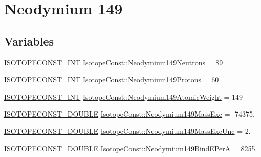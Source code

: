 \hypertarget{group___isotope_const-_neodymium-_nd149}{}\section{Neodymium 149}
\label{group___isotope_const-_neodymium-_nd149}
\subsection*{Variables}
\begin{DoxyCompactItemize}
\item 
\mbox{\hyperlink{group___isotope_const-_macros_ga5f18360b3e99483a35c32d789e62621c}{I\+S\+O\+T\+O\+P\+E\+C\+O\+N\+S\+T\+\_\+\+I\+NT}} \mbox{\hyperlink{group___isotope_const-_neodymium-_nd149_ga91c16a3af0b89b02246fdb759c967365}{Isotope\+Const\+::\+Neodymium149\+Neutrons}} = 89
\item 
\mbox{\hyperlink{group___isotope_const-_macros_ga5f18360b3e99483a35c32d789e62621c}{I\+S\+O\+T\+O\+P\+E\+C\+O\+N\+S\+T\+\_\+\+I\+NT}} \mbox{\hyperlink{group___isotope_const-_neodymium-_nd149_gaab24633ba64d9ac283f7f897c2a4fff1}{Isotope\+Const\+::\+Neodymium149\+Protons}} = 60
\item 
\mbox{\hyperlink{group___isotope_const-_macros_ga5f18360b3e99483a35c32d789e62621c}{I\+S\+O\+T\+O\+P\+E\+C\+O\+N\+S\+T\+\_\+\+I\+NT}} \mbox{\hyperlink{group___isotope_const-_neodymium-_nd149_ga4831a82bcad0592d4f752eb4a90e6da5}{Isotope\+Const\+::\+Neodymium149\+Atomic\+Weight}} = 149
\item 
\mbox{\hyperlink{group___isotope_const-_macros_ga8f45a7272ce02c0b4c65c44636ed719a}{I\+S\+O\+T\+O\+P\+E\+C\+O\+N\+S\+T\+\_\+\+D\+O\+U\+B\+LE}} \mbox{\hyperlink{group___isotope_const-_neodymium-_nd149_ga723d2837d5a39bbaf825508f105f47ae}{Isotope\+Const\+::\+Neodymium149\+Mass\+Exc}} = -\/74375.
\item 
\mbox{\hyperlink{group___isotope_const-_macros_ga8f45a7272ce02c0b4c65c44636ed719a}{I\+S\+O\+T\+O\+P\+E\+C\+O\+N\+S\+T\+\_\+\+D\+O\+U\+B\+LE}} \mbox{\hyperlink{group___isotope_const-_neodymium-_nd149_gae8f868c1cafdf1606cd1c7a3465e4843}{Isotope\+Const\+::\+Neodymium149\+Mass\+Exc\+Unc}} = 2.
\item 
\mbox{\hyperlink{group___isotope_const-_macros_ga8f45a7272ce02c0b4c65c44636ed719a}{I\+S\+O\+T\+O\+P\+E\+C\+O\+N\+S\+T\+\_\+\+D\+O\+U\+B\+LE}} \mbox{\hyperlink{group___isotope_const-_neodymium-_nd149_gaab0809038c1decc357431c2d8fe11bdd}{Isotope\+Const\+::\+Neodymium149\+Bind\+E\+PerA}} = 8255.
\item 

\end{DoxyCompactItemize}
